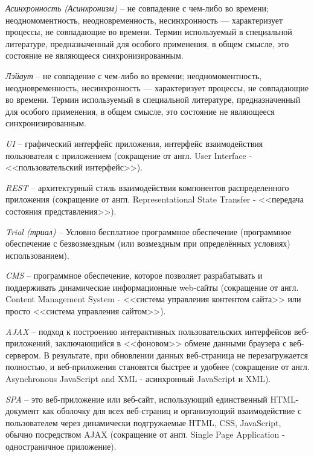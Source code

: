 \label{sec:definitions}

\emph{Асинхронность (Асинхронизм)} -- не совпадение с чем-либо во времени; неодномоментность, неодновременность, несинхронность — характеризует процессы, не совпадающие во времени. Термин используемый в специальной литературе, предназначенный для особого применения, в общем смысле, это состояние не являющееся синхронизированным.

\emph{Лэйаут} -- не совпадение с чем-либо во времени; неодномоментность, неодновременность, несинхронность — характеризует процессы, не совпадающие во времени. Термин используемый в специальной литературе, предназначенный для особого применения, в общем смысле, это состояние не являющееся синхронизированным.

\emph{UI} -- графический интерфейс приложения, интерфейс взаимодействия пользователя с приложением (сокращение от англ. User Interface - <<пользовательский интерфейс>>).

\emph{REST} -- архитектурный стиль взаимодействия компонентов распределенного приложения (сокращение от англ. Representational State Transfer - <<передача состояния представления>>).

\emph{Trial (триал)} -- Условно бесплатное программное обеспечение (программное обеспечение с безвозмездным (или возмездным при определённых условиях) использованием).

\emph{CMS} -- программное обеспечение, которое позволяет разрабатывать и поддерживать динамические информационные web-сайты (сокращение от англ. Content Management System - <<система управления контентом сайта>> или просто <<система управления сайтом>>).

\emph{AJAX} -- подход к построению интерактивных пользовательских интерфейсов веб-приложений, заключающийся в <<фоновом>> обмене данными браузера с веб-сервером. В результате, при обновлении данных веб-страница не перезагружается полностью, и веб-приложения становятся быстрее и удобнее (сокращение от англ. Asynchronous JavaScript and XML - асинхронный JavaScript и XML).

\emph{SPA} -- это веб-приложение или веб-сайт, использующий единственный HTML-документ как оболочку для всех веб-страниц и организующий взаимодействие с пользователем через динамически подгружаемые HTML, CSS, JavaScript, обычно посредством AJAX (сокращение от англ. Single Page Application - одностраничное приложение).

\label{sec:introduction}


